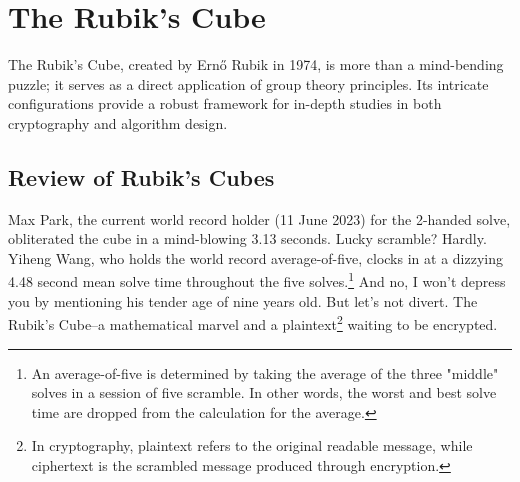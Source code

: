 \documentclass[12pt]{article}
\begin{document}
\newpage

\section{The Rubik's Cube}

The Rubik's Cube, created by Ernő Rubik in 1974, is more than a mind-bending puzzle; it serves as a direct application of group theory principles. Its intricate configurations provide a robust framework for in-depth studies in both cryptography and algorithm design.

\subsection{Review of Rubik's Cubes}

Max Park, the current world record holder (11 June 2023) for the 2-handed solve, obliterated the cube in a mind-blowing 3.13 seconds. Lucky scramble? Hardly. Yiheng Wang, who holds the world record average-of-five, clocks in at a dizzying 4.48 second mean solve time throughout the five solves.\footnote{An average-of-five is determined by taking the average of the three "middle" solves in a session of five scramble. In other words, the worst and best solve time are dropped from the calculation for the average.} And no, I won't depress you by mentioning his tender age of nine years old. But let's not divert. The Rubik's Cube--a mathematical marvel and a plaintext\footnote{In cryptography, plaintext refers to the original readable message, while ciphertext is the scrambled message produced through encryption.} waiting to be encrypted. \\
\end{document}
